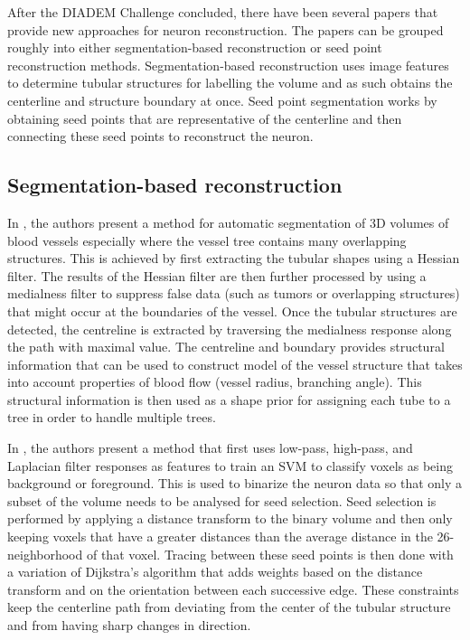 After the DIADEM Challenge concluded, there have been several
papers that provide new approaches for neuron reconstruction.  The
papers can be grouped roughly into either segmentation-based
reconstruction or seed point reconstruction methods. Segmentation-based
reconstruction uses image features to determine tubular structures
for labelling the volume and as such obtains the centerline and
structure boundary at once. Seed point segmentation works by
obtaining seed points that are representative of the centerline
and then connecting these seed points to reconstruct the neuron.

\subsection{Segmentation-based reconstruction}

In \textcite{Bauer2010}, the authors present a method for
automatic segmentation of 3D volumes of blood
vessels especially where the vessel tree
contains many overlapping structures. This
is achieved by first extracting the
tubular shapes using a Hessian filter. The
results of the Hessian filter are then
further processed by using a medialness filter
to suppress false data (such as tumors or
overlapping structures) that might occur at
the boundaries of the vessel. Once the
tubular structures are detected, the
centreline is extracted by traversing the
medialness response along the path with
maximal value. The centreline and boundary provides structural
information that can be used to construct
model of the vessel structure that takes
into account properties of blood flow
(vessel radius, branching angle). This
structural information is then used as
a shape prior for assigning each tube to a
tree in order to handle multiple
trees.

In \textcite{Jimenez2013}, the authors
present a method that first uses low-pass, high-pass, and Laplacian filter responses
as features to train an \acrshort{SVM} to classify voxels as
being background or foreground. This is
used to binarize the neuron data so that
only a subset of the volume needs to be
analysed for seed selection. Seed
selection is performed by applying a
distance transform to the binary volume
and then only keeping voxels that have a
greater distances than the average
distance in the 26-neighborhood of that
voxel. Tracing between these seed points
is then done with a variation of
Dijkstra's algorithm that adds weights
based on the distance transform
and on the orientation between each successive
edge. These constraints keep the centerline path
from deviating from the center of the
tubular structure and from having sharp
changes in direction.

